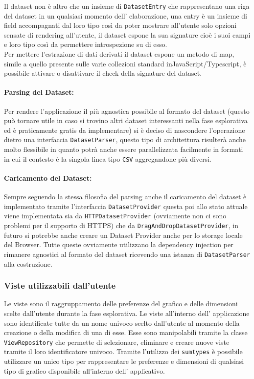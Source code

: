 \noindent
Il dataset non è altro che un insieme di \texttt{DatasetEntry} che rappresentano
una riga del dataset in un qualsiasi momento dell' elaborazione, una entry è un
insieme di field accompagnati dal loro tipo così da poter mostrare all'utente
solo opzioni sensate di rendering all'utente, il dataset espone la sua signature
cioè i suoi campi e loro tipo così da permettere introspezione su di esso.\\

\noindent
Per mettere l'estrazione di dati derivati il dataset espone un metodo di map,
simile a quello presente sulle varie collezioni standard inJavaScript/Typescript,
è possibile attivare o disattivare il check della signature del dataset.

\paragraph{Parsing del Dataset:}
Per rendere l'applicazione il più agnostica possibile al formato del dataset
(questo può tornare utile in caso si trovino altri dataset interessanti nella
fase esplorativa ed è praticamente gratis da implementare) si è deciso di
nascondere l'operazione dietro una interfaccia \texttt{DatasetParser}, questo
tipo di architettura risulterà anche molto flessibile in quanto potrà anche
essere parallelizzata facilmente in formati in cui il contesto è la singola
linea tipo \texttt{CSV} aggregandone più diversi.

\paragraph{Caricamento del Dataset:}
Sempre seguendo la stessa filosofia del parsing anche il caricamento del dataset
è implementato tramite l'interfaccia \texttt{DatasetProvider} questa poi allo stato
attuale viene implementata sia da \texttt{HTTPDatasetProvider} (ovviamente non ci
sono problemi per il supporto di HTTPS) che da \texttt{DragAndDropDatasetProvider}, in
futuro si potrebbe anche creare un Dataset Provider anche per lo storage locale del
Browser. Tutte queste ovviamente utilizzano la dependency injection per rimanere
agnostici al formato del dataset ricevendo una istanza di \texttt{DatasetParser}
alla costruzione.

\subsubsection{Viste utilizzabili dall'utente}
Le viste sono il raggruppamento delle preferenze del grafico e delle dimensioni
scelte dall'utente durante la fase esplorativa. Le viste all'interno dell'
applicazione sono identificate tutte da un nome univoco scelto dall'utente al
momento della creazione o della modifica di una di esse. Esse sono manipolabili
tramite la classe \texttt{ViewRepository} che permette di selezionare, eliminare
e creare nuove viste tramite il loro identificatore univoco. Tramite l'utilizzo
dei \texttt{sumtypes} è possibile utilizzare un unico tipo per rappresentare le
preferenze e dimensioni di qualsiasi tipo di grafico disponibile all'interno
dell' applicativo.

